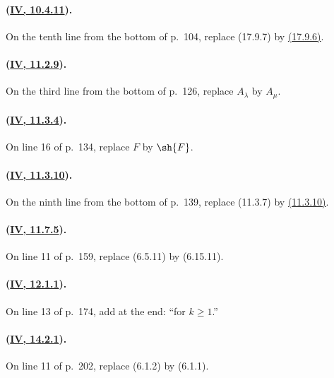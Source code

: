 \paragraph{({\texorpdfstring{\protect\hyperlink{ega4.c04.statement.10-4-11}{IV, 10.4.11}}{IV, 10.4.11}}).}
On the tenth line from the bottom of p.~104, replace (17.9.7) by
{\hyperlink{ega4.c04.prop.17-9-6}{(17.9.6)}}.

\paragraph{({\texorpdfstring{\protect\hyperlink{ega4.c04.thm.11-2-9}{IV, 11.2.9}}{IV, 11.2.9}}).}
On the third line from the bottom of p.~126, replace $A_\lambda$ by
$A_\mu$.

\paragraph{({\texorpdfstring{\protect\hyperlink{ega4.c04.prop.11-3-4}{IV, 11.3.4}}{IV, 11.3.4}}).}
On line 16 of p.~134, replace $F$ by $\sh{F}$.

\paragraph{({\texorpdfstring{\protect\hyperlink{ega4.c04.thm.11-3-10}{IV, 11.3.10}}{IV, 11.3.10}}).}
On the ninth line from the bottom of p.~139, replace (11.3.7) by
{\hyperlink{ega4.c04.thm.11-3-10}{(11.3.10)}}.

\paragraph{({\texorpdfstring{\protect\hyperlink{ega4.c04.statement.11-7-5}{IV, 11.7.5}}{IV, 11.7.5}}).}
On line 11 of p.~159, replace (6.5.11) by (6.15.11).

\paragraph{({\texorpdfstring{\protect\hyperlink{ega4.c04.thm.12-1-1}{IV, 12.1.1}}{IV, 12.1.1}}).}
On line 13 of p.~174, add at the end: ``for $k\geq 1$.''

\paragraph{({\texorpdfstring{\protect\hyperlink{ega4.c04.thm.14-2-1}{IV, 14.2.1}}{IV, 14.2.1}}).}
On line 11 of p.~202, replace (6.1.2) by (6.1.1).

